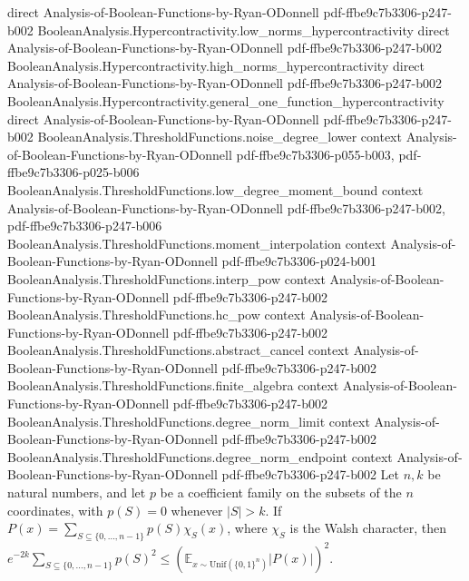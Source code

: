 \begin{theorem}
  {direct}
  {Analysis-of-Boolean-Functions-by-Ryan-ODonnell}
  {pdf-ffbe9c7b3306-p247-b002}
\proofstep
  {BooleanAnalysis.Hypercontractivity.low_norms_hypercontractivity}
  {direct}
  {Analysis-of-Boolean-Functions-by-Ryan-ODonnell}
  {pdf-ffbe9c7b3306-p247-b002}
\proofstep
  {BooleanAnalysis.Hypercontractivity.high_norms_hypercontractivity}
  {direct}
  {Analysis-of-Boolean-Functions-by-Ryan-ODonnell}
  {pdf-ffbe9c7b3306-p247-b002}
\proofstep
  {BooleanAnalysis.Hypercontractivity.general_one_function_hypercontractivity}
  {direct}
  {Analysis-of-Boolean-Functions-by-Ryan-ODonnell}
  {pdf-ffbe9c7b3306-p247-b002}
\proofstep
  {BooleanAnalysis.ThresholdFunctions.noise_degree_lower}
  {context}
  {Analysis-of-Boolean-Functions-by-Ryan-ODonnell}
  {pdf-ffbe9c7b3306-p055-b003,
    pdf-ffbe9c7b3306-p025-b006}
\proofstep
  {BooleanAnalysis.ThresholdFunctions.low_degree_moment_bound}
  {context}
  {Analysis-of-Boolean-Functions-by-Ryan-ODonnell}
  {pdf-ffbe9c7b3306-p247-b002,
    pdf-ffbe9c7b3306-p247-b006}
\proofstep
  {BooleanAnalysis.ThresholdFunctions.moment_interpolation}
  {context}
  {Analysis-of-Boolean-Functions-by-Ryan-ODonnell}
  {pdf-ffbe9c7b3306-p024-b001}
\proofstep
  {BooleanAnalysis.ThresholdFunctions.interp_pow}
  {context}
  {Analysis-of-Boolean-Functions-by-Ryan-ODonnell}
  {pdf-ffbe9c7b3306-p247-b002}
\proofstep
  {BooleanAnalysis.ThresholdFunctions.hc_pow}
  {context}
  {Analysis-of-Boolean-Functions-by-Ryan-ODonnell}
  {pdf-ffbe9c7b3306-p247-b002}
\proofstep
  {BooleanAnalysis.ThresholdFunctions.abstract_cancel}
  {context}
  {Analysis-of-Boolean-Functions-by-Ryan-ODonnell}
  {pdf-ffbe9c7b3306-p247-b002}
\proofstep
  {BooleanAnalysis.ThresholdFunctions.finite_algebra}
  {context}
  {Analysis-of-Boolean-Functions-by-Ryan-ODonnell}
  {pdf-ffbe9c7b3306-p247-b002}
\proofstep
  {BooleanAnalysis.ThresholdFunctions.degree_norm_limit}
  {context}
  {Analysis-of-Boolean-Functions-by-Ryan-ODonnell}
  {pdf-ffbe9c7b3306-p247-b002}
\proofstep
  {BooleanAnalysis.ThresholdFunctions.degree_norm_endpoint}
  {context}
  {Analysis-of-Boolean-Functions-by-Ryan-ODonnell}
  {pdf-ffbe9c7b3306-p247-b002}
Let $n,k$ be natural numbers, and let $p$ be a coefficient family on the subsets of the
$n$ coordinates, with $p(S)=0$ whenever $|S|>k$. If
$P(x)=\sum_{S\subseteq\{0,\ldots,n-1\}}p(S)\chi_S(x)$, where $\chi_S$ is the Walsh
character, then $\displaystyle
e^{-2k}\sum_{S\subseteq\{0,\ldots,n-1\}}p(S)^2\leq\left(\mathbb
E_{x\sim\mathrm{Unif}(\{0,1\}^n)}|P(x)|\right)^2$.
\end{theorem}

